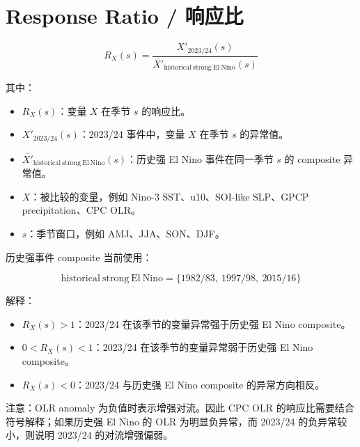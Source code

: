 \documentclass[12pt]{article}
\begin{document}
\section*{Response Ratio / 响应比}

\[
R_X(s)
=
\frac{X'_{2023/24}(s)}
{\overline{X'}_{\mathrm{historical\ strong\ El\ Nino}}(s)}
\]

\noindent
其中：

\begin{itemize}
  \item \(R_X(s)\)：变量 \(X\) 在季节 \(s\) 的响应比。
  \item \(X'_{2023/24}(s)\)：2023/24 事件中，变量 \(X\) 在季节 \(s\) 的异常值。
  \item \(\overline{X'}_{\mathrm{historical\ strong\ El\ Nino}}(s)\)：历史强 El Nino 事件在同一季节 \(s\) 的 composite 异常值。
  \item \(X\)：被比较的变量，例如 Nino-3 SST、u10、SOI-like SLP、GPCP precipitation、CPC OLR。
  \item \(s\)：季节窗口，例如 AMJ、JJA、SON、DJF。
\end{itemize}

\noindent
历史强事件 composite 当前使用：

\[
\mathrm{historical\ strong\ El\ Nino}
=
\{1982/83,\ 1997/98,\ 2015/16\}
\]

\noindent
解释：

\begin{itemize}
  \item \(R_X(s)>1\)：2023/24 在该季节的变量异常强于历史强 El Nino composite。
  \item \(0<R_X(s)<1\)：2023/24 在该季节的变量异常弱于历史强 El Nino composite。
  \item \(R_X(s)<0\)：2023/24 与历史强 El Nino composite 的异常方向相反。
\end{itemize}

\noindent
注意：OLR anomaly 为负值时表示增强对流。因此 CPC OLR 的响应比需要结合符号解释；如果历史强 El Nino 的 OLR 为明显负异常，而 2023/24 的负异常较小，则说明 2023/24 的对流增强偏弱。
\end{document}
